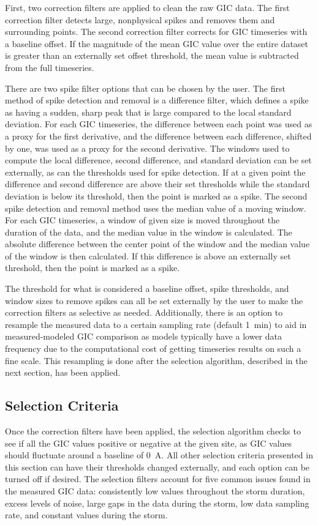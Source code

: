 \documentclass[draft]{agujournal2019}
\begin{document}
First, two correction filters are applied to clean the raw GIC data. The first correction filter detects large, nonphysical spikes and removes them and surrounding points. The second correction filter corrects for GIC timeseries with a baseline offset. If the magnitude of the mean GIC value over the entire dataset is greater than an externally set offset threshold, the mean value is subtracted from the full timeseries.

There are two spike filter options that can be chosen by the user.
The first method of spike detection and removal is a difference filter, which defines a spike as having a sudden, sharp peak that is large compared to the local standard deviation. For each GIC timeseries, the difference between each point was used as a proxy for the first derivative, and the difference between each difference, shifted by one, was used as a proxy for the second derivative. The windows used to compute the local difference, second difference, and standard deviation can be set externally, as can the thresholds used for spike detection. If at a given point the difference and second difference are above their set thresholds while the standard deviation is below its threshold, then the point is marked as a spike.
The second spike detection and removal method uses the median value of a moving window. For each GIC timeseries, a window of given size is moved throughout the duration of the data, and the median value in the window is calculated. The absolute difference between the center point of the window and the median value of the window is then calculated. If this difference is above an externally set threshold, then the point is marked as a spike.

The threshold for what is considered a baseline offset, spike thresholds, and window sizes to remove spikes can all be set externally by the user to make the correction filters as selective as needed. Additionally, there is an option to resample the measured data to a certain sampling rate (default 1~min) to aid in measured-modeled GIC comparison as models typically have a lower data frequency due to the computational cost of getting timeseries results on such a fine scale. This resampling is done after the selection algorithm, described in the next section, has been applied.

\subsection{Selection Criteria}
Once the correction filters have been applied, the selection algorithm checks to see if all  the GIC values positive or negative at the given site, as GIC values should fluctuate around a baseline of 0~A. All other selection criteria presented in this section can have their thresholds changed externally, and each option can be turned off if desired. The selection filters account for five common issues found in the measured GIC data: consistently low values throughout the storm duration, excess levels of noise, large gaps in the data during the storm, low data sampling rate, and constant values during the storm. 
\end{document}
